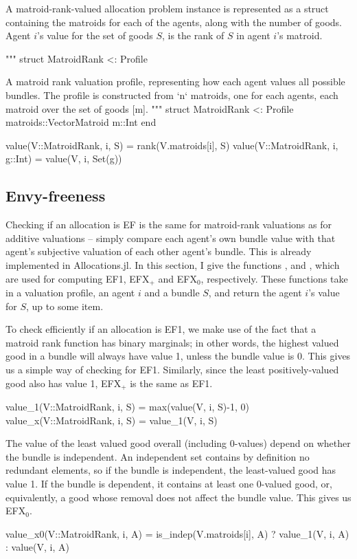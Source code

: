 A matroid-rank-valued allocation problem instance is represented as a struct containing the matroids for each of the agents, along with the number of goods. Agent $i$'s value for the set of goods $S$, is the rank of $S$ in agent $i$'s matroid.
\begin{jllisting}
"""
    struct MatroidRank <: Profile

A matroid rank valuation profile, representing how each agent values all possible bundles. The profile is constructed from `n` matroids, one for each agents, each matroid over the set of goods [m]. 
"""
struct MatroidRank <: Profile
    matroids::Vector{Matroid}
    m::Int
end

value(V::MatroidRank, i, S) = rank(V.matroids[i], S)
value(V::MatroidRank, i, g::Int) = value(V, i, Set(g))
\end{jllisting}

\subsection*{Envy-freeness}
Checking if an allocation is EF is the same for matroid-rank valuations as for additive valuations -- simply compare each agent's own bundle value with that agent's subjective valuation of each other agent's bundle. This is already implemented in Allocations.jl. In this section, I give the functions ,  and , which are used for computing EF1, EFX$_+$ and EFX$_0$, respectively. These functions take in a valuation profile, an agent $i$ and a bundle $S$, and return the agent $i$'s value for $S$, up to some item. 

To check efficiently if an allocation is EF1, we make use of the fact that a matroid rank function has binary marginals; in other words, the highest valued good in a bundle will always have value 1, unless the bundle value is 0. This gives us a simple way of checking for EF1. Similarly, since the least positively-valued good also has value 1, EFX$_+$ is the same as EF1. 
\begin{jllisting}
value_1(V::MatroidRank, i, S) = max(value(V, i, S)-1, 0)
value_x(V::MatroidRank, i, S) = value_1(V, i, S)
\end{jllisting}

The value of the least valued good overall (including 0-values) depend on whether the bundle is independent. An independent set contains by definition no redundant elements, so if the bundle is independent, the least-valued good has value 1. If the bundle is dependent, it contains at least one 0-valued good, or, equivalently, a good whose removal does not affect the bundle value. This gives us EFX$_0$.
\begin{jllisting}
value_x0(V::MatroidRank, i, A) =
    is_indep(V.matroids[i], A) ? value_1(V, i, A) : value(V, i, A)
\end{jllisting}


